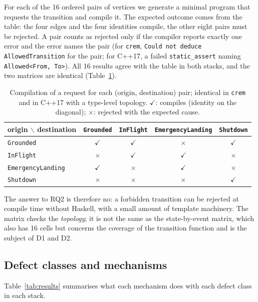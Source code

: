 \documentclass[review,12pt]{elsarticle}
\newcommand{\code}[1]{\texttt{#1}}
\newcommand{\crem}{\texttt{crem}}
\begin{document}
For each of the 16 ordered pairs of vertices we generate a minimal program that requests the transition and compile it. The expected outcome comes from the table: the four edges and the four identities compile, the other eight pairs must be rejected. A pair counts as rejected only if the compiler reports exactly one error and the error names the pair (for \crem{}, \code{Could not deduce AllowedTransition} for the pair; for C++17, a failed \code{static\_assert} naming \code{Allowed<From, To>}). All 16 results agree with the table in both stacks, and the two matrices are identical (Table~\ref{tab:matrix}).

\begin{table}[t]
\caption{Compilation of a request for each (origin, destination) pair; identical in \crem{} and in C++17 with a type-level topology. $\checkmark$: compiles (identity on the diagonal); $\times$: rejected with the expected cause.}
\label{tab:matrix}
\centering
\footnotesize
\begin{tabular}{@{}lcccc@{}}
\toprule
origin $\backslash$ destination & \code{Grounded} & \code{InFlight} & \code{EmergencyLanding} & \code{Shutdown} \\
\midrule
\code{Grounded}         & $\checkmark$ & $\checkmark$ & $\times$ & $\checkmark$ \\
\code{InFlight}         & $\times$ & $\checkmark$ & $\checkmark$ & $\times$ \\
\code{EmergencyLanding} & $\checkmark$ & $\times$ & $\checkmark$ & $\times$ \\
\code{Shutdown}         & $\times$ & $\times$ & $\times$ & $\checkmark$ \\
\bottomrule
\end{tabular}
\end{table}

The answer to RQ2 is therefore no: a forbidden transition can be rejected at compile time without Haskell, with a small amount of template machinery. The matrix checks the \emph{topology}; it is not the same as the state-by-event matrix, which also has 16 cells but concerns the coverage of the transition function and is the subject of D1 and D2.

\subsection{Defect classes and mechanisms}
\label{sec:classes}

Table~\ref{tab:results} summarises what each mechanism does with each defect class in each stack.
\end{document}
